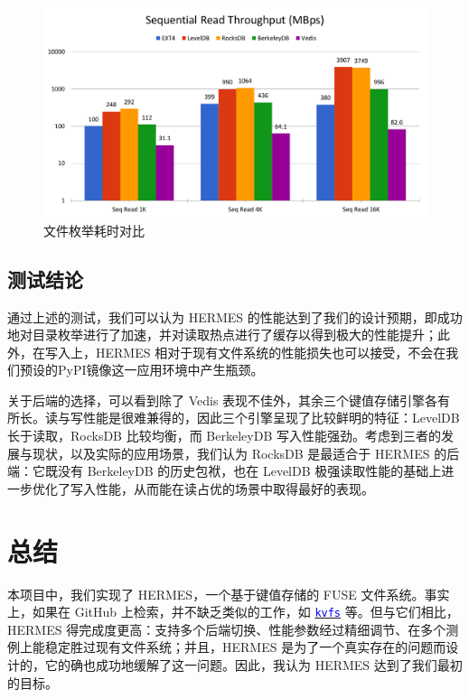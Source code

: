 \documentclass{ctexart}
\begin{document}
\begin{figure}[htbp]
\centering
\caption{文件枚举耗时对比}
\label{fig:file-enumerate}
\includegraphics[page=6,width=\textwidth]{HERMES_perf_plot.pdf}
\end{figure}

\subsection{测试结论}

通过上述的测试，我们可以认为 HERMES 的性能达到了我们的设计预期，即成功地对目录枚举进行了加速，并对读取热点进行了缓存以得到极大的性能提升；此外，在写入上，HERMES 相对于现有文件系统的性能损失也可以接受，不会在我们预设的PyPI镜像这一应用环境中产生瓶颈。

关于后端的选择，可以看到除了 Vedis 表现不佳外，其余三个键值存储引擎各有所长。读与写性能是很难兼得的，因此三个引擎呈现了比较鲜明的特征：LevelDB 长于读取，RocksDB 比较均衡，而 BerkeleyDB 写入性能强劲。考虑到三者的发展与现状，以及实际的应用场景，我们认为 RocksDB 是最适合于 HERMES 的后端：它既没有 BerkeleyDB 的历史包袱，也在 LevelDB 极强读取性能的基础上进一步优化了写入性能，从而能在读占优的场景中取得最好的表现。

\section{总结}

本项目中，我们实现了 HERMES，一个基于键值存储的 FUSE 文件系统。事实上，如果在 GitHub 上检索，并不缺乏类似的工作，如 \href{https://github.com/qznc/kvfs}{\textcolor{blue}{\texttt{kvfs}}} 等。但与它们相比，HERMES 得完成度更高：支持多个后端切换、性能参数经过精细调节、在多个测例上能稳定胜过现有文件系统；并且，HERMES 是为了一个真实存在的问题而设计的，它的确也成功地缓解了这一问题。因此，我认为 HERMES 达到了我们最初的目标。
\end{document}
